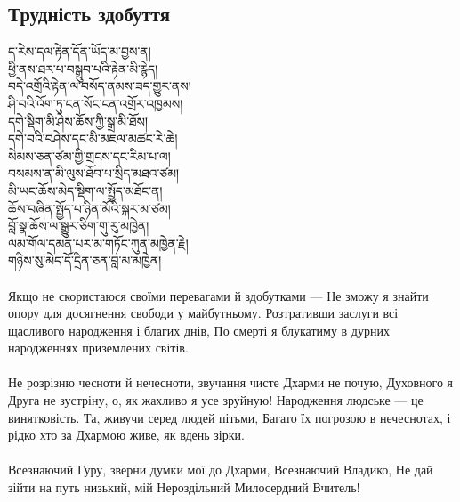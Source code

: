 \subsection*{Трудність здобуття}
\ti ད་རེས་དལ་རྟེན་དོན་ཡོད་མ་བྱས་ན།\\
ཕྱི་ནས་ཐར་པ་བསྒྲུབ་པའི་རྟེན་མི་རྙེད།\\
བདེ་འགྲོའི་རྟེན་ལ་བསོད་ནམས་ཟད་གྱུར་ནས།\\
ཤི་བའི་འོག་ཏུ་ངན་སོང་ངན་འགྲོར་འཁྱམས།\\
དགེ་སྡིག་མི་ཤེས་ཆོས་ཀྱི་སྒྲ་མི་ཐོས།\\
དགེ་བའི་བཤེས་དང་མི་མཇལ་མཚང་རེ་ཆེ།\\
སེམས་ཅན་ཙམ་གྱི་གྲངས་དང་རིམ་པ་ལ།\\
བསམས་ན་མི་ལུས་ཐོབ་པ་སྲིད་མཐའ་ཙམ།\\
མི་ཡང་ཆོས་མེད་སྡིག་ལ་སྤྱོད་མཐོང་ན།\\
ཆོས་བཞིན་སྤྱོད་པ་ཉིན་མོའི་སྐར་མ་ཙམ།\\
བློ་སྣ་ཆོས་ལ་སྒྱུར་ཅིག་གུ་རུ་མཁྱེན།\\
ལམ་གོལ་དམན་པར་མ་གཏོང་ཀུན་མཁྱེན་རྗེ།\\
གཉིས་སུ་མེད་དོ་དྲིན་ཅན་བླ་མ་མཁྱེན།\\
\\
\ru
Якщо не скористаюся своїми перевагами й здобутками ---
Не зможу я знайти опору для досягнення свободи у майбутньому.
Розтративши заслуги всі щасливого народження і благих днів,
По смерті я блукатиму в дурних народженнях приземлених світів. \\
\\
Не розрізню чесноти й нечесноти, звучання чисте Дхарми не почую,
Духовного я Друга не зустріну, о, як жахливо я усе зруйную!
Народження людське --- це винятковість. Та, живучи серед людей пітьми,
Багато їх погрозою в нечеснотах, і рідко хто за Дхармою живе, як вдень зірки.\\
\\
Всезнаючий Гуру, зверни думки мої до Дхарми, Всезнаючий Владико,
Не дай зійти на путь низький, мій Нероздільний Милосердний Вчитель!\\

\newpage
